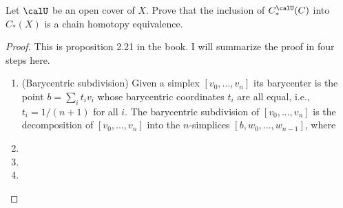 \begin{problem}
Let $\calU$ be an open cover of $X$. Prove that the inclusion of
$C_*^{\calU}(C)$ into $C_*(X)$ is a chain homotopy equivalence.
\end{problem}
\begin{proof}
This is proposition 2.21 in the book. I will summarize the proof in four
steps here.
\begin{enumerate}[label=\textbf{(\arabic*)}]
\item (Barycentric subdivision) Given a simplex $[v_0,...,v_n]$ its
  barycenter is the point $b=\sum_it_iv_i$ whose barycentric coordinates
  $t_i$ are all equal, i.e., $t_i=1/(n+1)$ for all $i$. The barycentric
  subdivision of $\left[v_0,...,v_n\right]$ is the decomposition of
  $[v_0,...,v_n]$ into the $n$-simplices $\left[b,w_0,...,w_{n-1}\right]$,
  where

\item
\item
\item
\end{enumerate}
\end{proof}

